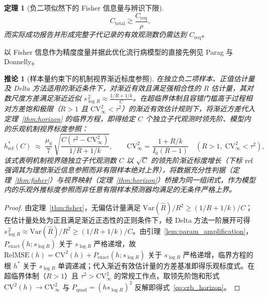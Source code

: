 \documentclass[11pt,a4paper]{article}
\theoremstyle{plain}
\newtheorem{theorem}{定理}
\newtheorem{corollary}{推论}
\theoremstyle{definition}
\begin{document}
\begin{theorem}[负二项似然下的 Fisher 信息量与辨识下限]
\begin{equation}
C_{\text{total}} \gtrsim \frac{C_{\text{req}}}{\rho},
\label{eq:sparse_sampling}
\end{equation}
而实际成功报告并形成完整子代记录的有效观测数仍需达到 $C_{\text{req}}$。
\end{theorem}

以 Fisher 信息作为精度度量并据此优化流行病模型的直接先例见 Parag 与 Donnelly\citep{parag2020adaptive}。


\begin{corollary}[样本量约束下的机制视界渐近标度参照]\label{cor:crb_horizon}
在独立负二项样本、正值估计量及 Delta 方法适用的渐近条件下，对渐近有效且满足强相合性的 $R$ 估计量，其对数尺度方差满足渐近近似 $s_{\log R}^{\,2} \approx \frac{1/R + 1/k}{C}$。在超临界体制且容错门槛高于过程相对方差饱和极限（$R > 1$ 且 $\text{CV}^2_\infty < \tau^2$）的渐近有效估计规则下，将渐近方差代入定理~\ref{thm:horizon} 的临界方程，即得给定 $C$ 个独立子代观测时领先阶、模型内的乐观机制视界标度参照：
\begin{equation}
h^*_{\text{ref}}(C) \;\approx\; \frac{\mu_g}{7}\,\sqrt{\frac{C\left(\tau^2 - \text{CV}^2_\infty\right)}{1/R+1/k}},
\qquad \text{CV}^2_\infty = \frac{1+R/k}{I_0(R-1)} \quad (R > 1, \; \text{CV}^2_\infty < \tau^2),
\label{eq:crb_horizon}
\end{equation}
该式表明机制视界随独立子代观测数 $C$ 以 $\sqrt{C}$ 的领先阶渐近标度增长（下标 $\text{ref}$ 强调其为理想渐近信息参照而非有限样本绝对上界），将数据充分性判据（定理~\ref{thm:fisher}）与视界映射（定理~\ref{thm:horizon}）桥接为同一组闭式，作为模型内的乐观外推标度参照而非任意有限样本预测器均满足的无条件严格上界。
\end{corollary}

\begin{proof}
由定理~\ref{thm:fisher}，无偏估计量满足 $\text{Var}(\hat{R})/R^2 \ge (1/R+1/k)/C$；在估计量处处为正且满足渐近正态性的正则条件下，经 Delta 方法一阶展开可得 $s_{\log R}^{\,2} \approx \text{Var}(\hat{R})/R^2 \ge (1/R+1/k)/C$。由引理~\ref{lem:param_amplification}，$P_{\text{exact}}(h;s_{\log R})$ 关于 $s_{\log R}$ 严格递增，故 $\text{RelMSE}(h) = \text{CV}^2(h) + P_{\text{exact}}(h;s_{\log R})$ 关于 $s_{\log R}$ 严格递增，临界方程的根 $h^*$ 关于 $s_{\log R}$ 单调递减；代入渐近有效估计量的方差基准即得乐观标度式。在超临界体制（$R > 1$）且 $\tau^2 > \text{CV}^2_\infty$ 的常规工作点，取领先阶饱和形式 $\text{CV}^2(h) \to \text{CV}^2_\infty$ 与 $P_{\text{quad}} = (h s_{\log R})^2$ 反解即得式~\eqref{eq:crb_horizon}。
\end{proof}
\end{document}
